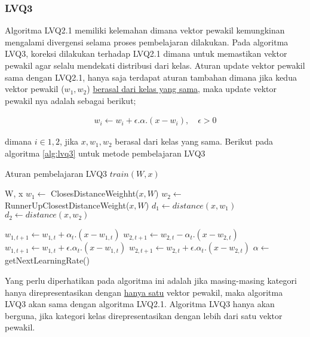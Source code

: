 \subsubsection*{LVQ3}
Algoritma LVQ2.1 memiliki kelemahan dimana vektor pewakil kemungkinan mengalami
divergensi selama proses pembelajaran dilakukan\cite{Sato:1998}. Pada algoritma
LVQ3, koreksi dilakukan terhadap LVQ2.1 dimana untuk memastikan vektor pewakil
agar selalu mendekati distribusi dari kelas. Aturan update vektor pewakil sama
dengan LVQ2.1, hanya saja terdapat aturan tambahan dimana jika kedua vektor
pewakil ($w_1, w_2$) \underline{berasal dari kelas yang sama}, maka update
vektor pewakil nya adalah sebagai berikut;

\begin{align}
w_i \leftarrow w_i + \epsilon . \alpha . (x - w_i), \quad \epsilon > 0
\end{align}

\noindent
dimana $i \in {1,2}$, jika $x, w_1, w_2$ berasal dari kelas yang sama.
Berikut pada algoritma \ref{alg:lvq3} untuk metode pembelajaran LVQ3

\begin{algorithm}  
\scriptsize 
\caption{Aturan pembelajaran LVQ3 $train(W, x)$}          
\label{alg:lvq3}                           
\begin{algorithmic}                    %
	\REQUIRE W, x
	\STATE $w_1 \leftarrow $ ClosesDistanceWeighht($x, W$)
	\STATE $w_2 \leftarrow $ RunnerUpClosestDistanceWeight($x, W$)
	\STATE $d_1 \leftarrow distance(x, w_1)$
	\STATE $d_2 \leftarrow distance(x, w_2)$
	
			\STATE $w_{1,t+1} \leftarrow w_{1,t} + \alpha_t . (x - w_{1,t})$
			\STATE $w_{2,t+1} \leftarrow w_{2,t} - \alpha_t . (x - w_{2,t})$
		\ENDIF
	\ELSE
		\STATE $w_{1,t+1} \leftarrow w_{1,t} + \epsilon.\alpha_t . (x - w_{1,t})$
		\STATE $w_{2,t+1} \leftarrow w_{2,t} + \epsilon.\alpha_t . (x - w_{2,t})$
	\ENDIF
	\STATE $\alpha \leftarrow $ getNextLearningRate()
\end{algorithmic}
\end{algorithm}  

Yang perlu diperhatikan pada algoritma ini adalah jika masing-masing kategori
hanya direpresentasikan dengan \underline{hanya satu} vektor pewakil, maka
algoritma LVQ3 akan sama dengan algoritma LVQ2.1. Algoritma LVQ3 hanya akan
berguna, jika kategori kelas direpresentasikan dengan lebih dari satu vektor
pewakil.

